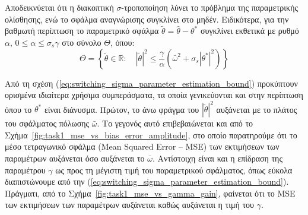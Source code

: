 \documentclass[a4paper,12pt]{article}
\begin{document}
Αποδεικνύεται ότι η διακοπτική $\sigma$-τροποποίηση λύνει το πρόβλημα της παραμετρικής ολίσθησης, 
ενώ το σφάλμα αναγνώρισης συγκλίνει στο μηδέν. Ειδικότερα, για την βαθμωτή περίπτωση το παραμετρικό 
σφάλμα $\tilde{\theta} = \hat{\theta} - \theta^*$ συγκλίνει εκθετικά με ρυθμό 
$\alpha, \,0 \leq \alpha \leq \sigma_s \gamma $ στο σύνολο $\Theta$, όπου:
\begin{equation}
    \Theta = \left\{ \tilde{\theta} \in \mathbb{R}: \quad |\tilde{\theta}|^2 \leq 
    \frac{\gamma}{\alpha}\left(\bar{\omega}^2 + \sigma_s |\theta^*|^2\right)\right\}
    \label{eq:switching_sigma_parameter_estimation_bound}
\end{equation}

Από τη σχέση (\ref{eq:switching_sigma_parameter_estimation_bound}) προκύπτουν ορισμένα ιδιαίτερα 
χρήσιμα συμπεράσματα, τα οποία γενικεύονται και στην περίπτωση όπου το $\theta^*$ είναι διάνυσμα. 
Πρώτον, το άνω φράγμα του $|\tilde{\theta}|^2$ αυξάνεται με το πλάτος του σφάλματος πόλωσης 
$\bar{\omega}$. Το γεγονός αυτό επιβεβαιώνεται και από το Σχήμα~\ref{fig:task1_mse_vs_bias_error_amplitude},
στο οποίο παρατηρούμε ότι το μέσο τετραγωνικό σφάλμα 
(Mean Squared Error -- MSE) των εκτιμήσεων των παραμέτρων 
αυξάνεται όσο αυξάνεται το $\bar{\omega}$. Αντίστοιχη είναι και η επίδραση της παραμέτρου $\gamma$ ως 
προς τη μέγιστη τιμή του παραμετρικού σφάλματος, όπως εύκολα διαπιστώνουμε από την
(\ref{eq:switching_sigma_parameter_estimation_bound}). Πράγματι, από το 
Σχήμα~\ref{fig:task1_mse_vs_gamma_gain}, φαίνεται ότι το MSE 
των εκτιμήσεων των παραμέτρων αυξάνεται καθώς αυξάνεται η τιμή του $\gamma$.
\end{document}

